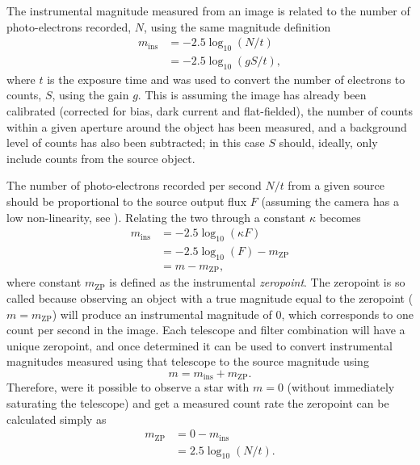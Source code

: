 \begin{colsection}
\begin{colsection}
The instrumental magnitude measured from an image is related to the number of photo-electrons recorded, $N$, using the same magnitude definition
%
\begin{equation}
    \begin{split}
        m_\text{ins} & = -2.5 \log_{10}(N/t) \\
                     & = -2.5 \log_{10}(gS/t),
    \end{split}
    \label{eq:ins_mag}
\end{equation}
%
where $t$ is the exposure time and  was used to convert the number of electrons to counts, $S$, using the gain $g$. This is assuming the image has already been calibrated (corrected for bias, dark current and flat-fielded), the number of counts within a given aperture around the object has been measured, and a background level of counts has also been subtracted; in this case $S$ should, ideally, only include counts from the source object.

The number of photo-electrons recorded per second $N/t$ from a given source should be proportional to the source output flux $F$ (assuming the camera has a low non-linearity, see ). Relating the two through a constant $\kappa$  becomes
%
\begin{equation}
    \begin{split}
        m_\text{ins} & = -2.5 \log_{10}\left(\kappa F\right) \\
                     & = -2.5 \log_{10}\left(F\right) - m_\text{ZP}    \\
                     & = m - m_\text{ZP},
    \end{split}
    \label{eq:ins_mag2}
\end{equation}
%
where constant $m_\text{ZP}$ is defined as the instrumental \emph{zeropoint}. The zeropoint is so called because observing an object with a true magnitude equal to the zeropoint ($m = m_\text{ZP}$) will produce an instrumental magnitude of 0, which corresponds to one count per second in the image. Each telescope and filter combination will have a unique zeropoint, and once determined it can be used to convert instrumental magnitudes measured using that telescope to the source magnitude using
%
\begin{equation}
    m = m_\text{ins} + m_\text{ZP}.
    \label{eq:zp}
\end{equation}
%
Therefore, were it possible to observe a star with $m=0$ (without immediately saturating the telescope) and get a measured count rate the zeropoint can be calculated simply as
%
\begin{equation}
    \begin{split}
        m_\text{ZP} & = 0 - m_\text{ins} \\
                    & = 2.5 \log_{10}(N/t).
    \end{split}
    \label{eq:zp2}
\end{equation}


\end{colsection}
\end{colsection}
